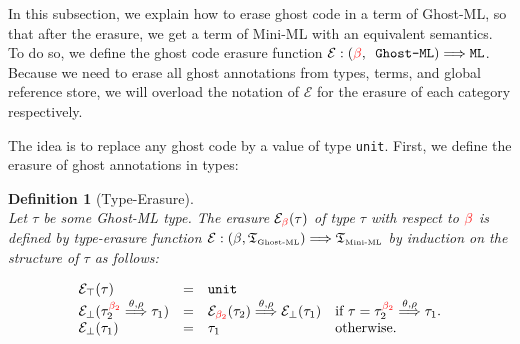 \documentclass[a4paper,11pt,oneside]{article}
\theoremstyle{plain}
\newtheorem{definition}{Definition}[subsection]
\newcommand{\gb}{\beta}
\newcommand{\gba}[1]{\beta_{#1}}
\newcommand{\gbr}{\textcolor{red}{\gb}}
\newcommand{\gbra}[1]{\textcolor{red}{\gba{#1}}}
\newcommand{\e}{\mathcal{E}}
\begin{document}
In this subsection, we explain how to erase ghost code in a term of Ghost-ML, so that
after the erasure, we get a term of Mini-ML with an equivalent semantics. 
To do so, we define the ghost code erasure function $\e: (\gbr,\texttt{ Ghost-ML}) \Longrightarrow \texttt{ML}$. 
Because we need to erase all ghost annotations from types, terms, and global reference store, we will overload the notation of $\e$ for the erasure of each  category respectively.

The idea is to replace any ghost code by a value of type \texttt{unit}.
First, we define the erasure of ghost annotations in types:
\begin{definition}[Type-Erasure] 
\label{type-erasure}
\hypertarget{type-erasure}{}
~\\
Let $\tau$ be some Ghost-ML type.
The erasure $\e_{\gbr}(\tau)$ of type $\tau$ with respect to $\gbr$ is defined by type-erasure function $\e: (\beta, \mathfrak{T}_{\text{\tiny Ghost-ML}}) \Longrightarrow \mathfrak{T}_{\text{\tiny Mini-ML}}$ by induction on the structure of $\tau$ as follows:
\begin{small}
\begin{displaymath} 
\begin{array}{llll}
 \e_{\top}(\tau) &=& \texttt{unit} & \\
 
\e_{\bot}(\tau_{2}^{\gbra{2}} \stackrel{\theta, \rho}{\Longrightarrow} \tau_{1})  
&=& \e_{\gbra{2}}(\tau_{2}) \stackrel{\theta, \rho}{\Longrightarrow} \e_{\bot}(\tau_{1}) &  \text{if } \tau = \tau_{2}^{\gbra{2}} \stackrel{\theta, \rho}{\Longrightarrow} \tau_{1}. \\
\e_{\bot}(\tau_{1}) &=& \tau_{1} & \text{otherwise}.\\
\end{array}
\end{displaymath}
\end{small}
\end{definition}
\end{document}
